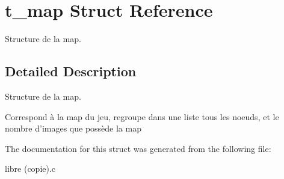 \hypertarget{structt__map}{\section{t\-\_\-map Struct Reference}
\label{structt__map}
}


Structure de la map.  




\subsection{Detailed Description}
Structure de la map. 

Correspond à la map du jeu, regroupe dans une liste tous les noeuds, et le nombre d'images que possède la map 

The documentation for this struct was generated from the following file\-:\begin{DoxyCompactItemize}
\item 
libre (copie).\-c\end{DoxyCompactItemize}
